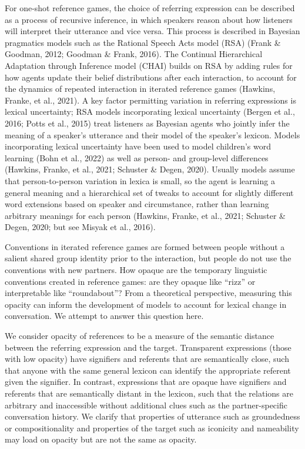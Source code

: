 \documentclass[10pt, letterpaper]{article}
\begin{document}
For one-shot reference games, the choice of referring expression can be
described as a process of recursive inference, in which speakers reason
about how listeners will interpret their utterance and vice versa. This
process is described in Bayesian pragmatics models such as the Rational
Speech Acts model (RSA) (Frank \& Goodman, 2012; Goodman \& Frank,
2016). The Continual Hierarchical Adaptation through Inference model
(CHAI) builds on RSA by adding rules for how agents update their belief
distributions after each interaction, to account for the dynamics of
repeated interaction in iterated reference games (Hawkins, Franke, et
al., 2021). A key factor permitting variation in referring expressions
is lexical uncertainty; RSA models incorporating lexical uncertainty
(Bergen et al., 2016; Potts et al., 2015) treat listeners as Bayesian
agents who jointly infer the meaning of a speaker's utterance and their
model of the speaker's lexicon. Models incorporating lexical uncertainty
have been used to model children's word learning (Bohn et al., 2022) as
well as person- and group-level differences (Hawkins, Franke, et al.,
2021; Schuster \& Degen, 2020). Usually models assume that
person-to-person variation in lexica is small, so the agent is learning
a general meaning and a hierarchical set of tweaks to account for
slightly different word extensions based on speaker and circumstance,
rather than learning arbitrary meanings for each person (Hawkins,
Franke, et al., 2021; Schuster \& Degen, 2020; but see Misyak et al.,
2016).

Conventions in iterated reference games are formed between people
without a salient shared group identity prior to the interaction, but
people do not use the conventions with new partners. How opaque are the
temporary linguistic conventions created in reference games: are they
opaque like ``rizz'' or interpretable like ``roundabout''? From a
theoretical perspective, measuring this opacity can inform the
development of models to account for lexical change in conversation. We
attempt to answer this question here.

We consider opacity of references to be a measure of the semantic
distance between the referring expression and the target. Transparent
expressions (those with low opacity) have signifiers and referents that
are semantically close, such that anyone with the same general lexicon
can identify the appropriate referent given the signifier. In contrast,
expressions that are opaque have signifiers and referents that are
semantically distant in the lexicon, such that the relations are
arbitrary and inaccessible without additional clues such as the
partner-specific conversation history. We clarify that properties of
utterance such as groundedness or compositionality and properties of the
target such as iconicity and nameability may load on opacity but are not
the same as opacity.
\end{document}
